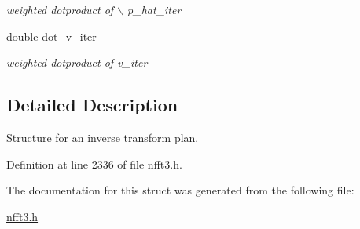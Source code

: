 \begin{CompactItemize}
\begin{CompactList}\small\item\em weighted dotproduct of $\backslash$ p\_\-hat\_\-iter \item\end{CompactList}\item 
\hypertarget{structinfst__plan_o17}{
double \hyperlink{structinfst__plan_o17}{dot\_\-v\_\-iter}}
\label{structinfst__plan_o17}

\begin{CompactList}\small\item\em weighted dotproduct of v\_\-iter \item\end{CompactList}\end{CompactItemize}


\subsection{Detailed Description}
Structure for an inverse transform plan. 



Definition at line 2336 of file nfft3.h.

The documentation for this struct was generated from the following file:\begin{CompactItemize}
\item 
\hyperlink{nfft3_8h}{nfft3.h}\end{CompactItemize}
